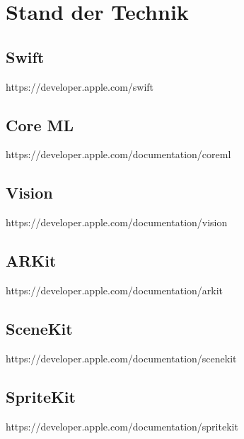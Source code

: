 \section{Stand der Technik}

\subsection{Swift}
https://developer.apple.com/swift

\subsection{Core ML}
https://developer.apple.com/documentation/coreml

\subsection{Vision}
https://developer.apple.com/documentation/vision

\subsection{ARKit}
https://developer.apple.com/documentation/arkit

\subsection{SceneKit}
https://developer.apple.com/documentation/scenekit

\subsection{SpriteKit}
https://developer.apple.com/documentation/spritekit
